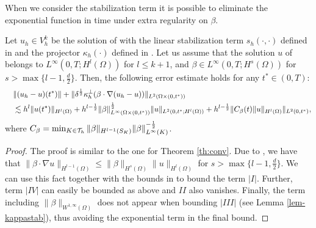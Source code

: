 
When we consider the stabilization term  it is possible to eliminate the exponential function in time under extra regularity on $\beta$.

\begin{theorem}[Convergence]\label{th:conv2}
Let $u_h \in V_h^k$ be the solution of  with the linear stabilization term $s_h(\cdot,\cdot)$ defined in   and the projector $\kappa_h(\cdot)$ defined in . Let us assume that the solution $u$ of  belongs to $L^\infty(0,T;H^l(\Omega))$ for $l \leq k+1$, and $\beta\in L^\infty(0,T;{H}^s(\Omega))$ for $s>\max \{ l -1, \frac{d}{2}\}$. Then, the following error estimate holds for any $t^* \in (0,T)$:
\begin{align*}
& \|(u_h-u)(t^*)\| + \| \delta^\frac{1}{2}  \kappa_h^\perp (\beta \cdot\nabla  (u_h-u)) \|_{L^2(\Omega \times (0,t^*))}   \nonumber \\ \quad &\lesssim    h^{l} \|u(t^*)\|_{H^l(\Omega)}  +  h^{l-\frac{1}{2}} \|\beta\|_{L^{\infty}(\Omega \times (0,t^*))}^{\frac{1}{2}} \|u\|_{L^2(0,t^*;H^l(\Omega))}
+ h^{l-\frac{1}{2}}  \| C_\beta(t) \|u\|_{H^l(\Omega)} \|_{L^2(0,t^*)},
\end{align*}
where $C_\beta=\min_{K \in \mathcal{T}_h} \|\beta\|_{H^{l-1}(S_K)}\|\beta\|^{-\frac{1}{2}}_{L^\infty(K)}$.
\end{theorem}
\begin{proof}
The proof is similar to the one for Theorem \ref{th:conv}. Due to \cite[Th. $1.4.4.2$]{grisvard2011elliptic}, we have that $\| \beta \cdot \nabla u \|_{H^{l-1}(\Omega)} \leq \| \beta \|_{H^s(\Omega)}  \|u\|_{H^l(\Omega)}$ for $s > \max \{ l -1, \frac{d}{2}\}$. We can use this fact together with the bounds in  to bound the term $|I|$. Further, term $|IV|$ can easily be bounded as above and $II$ also vanishes. Finally, the term including $\|\beta\|_{W^{1,\infty}(\Omega)}$ does not appear when bounding $|III|$ (see Lemma \ref{lem-kappastab}), thus avoiding the exponential term in the final bound.
\end{proof}
